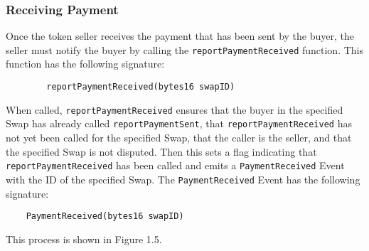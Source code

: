 \documentclass[11pt]{article}
\begin{document}
    \subsubsection*{Receiving Payment}

    Once the token seller receives the payment that has been sent by the buyer, the seller must
    notify the buyer by calling the \verb|reportPaymentReceived| function.
    This function has the following signature:
    \begin{verbatim}
        reportPaymentReceived(bytes16 swapID)
    \end{verbatim}

    When called, \verb|reportPaymentReceived| ensures that the buyer in the specified Swap has
    already called \verb|reportPaymentSent|, that \verb|reportPaymentReceived| has not yet been
    called for the specified Swap, that the caller is the seller, and that the specified Swap is not
    disputed.
    Then this sets a flag indicating that \verb|reportPaymentReceived| has been called and emits a
    \verb|PaymentReceived| Event with the ID of the specified Swap.
    The \verb|PaymentReceived| Event has the following signature:
    \begin{verbatim}
    PaymentReceived(bytes16 swapID)
    \end{verbatim}
    This process is shown in Figure 1.5.
\end{document}
